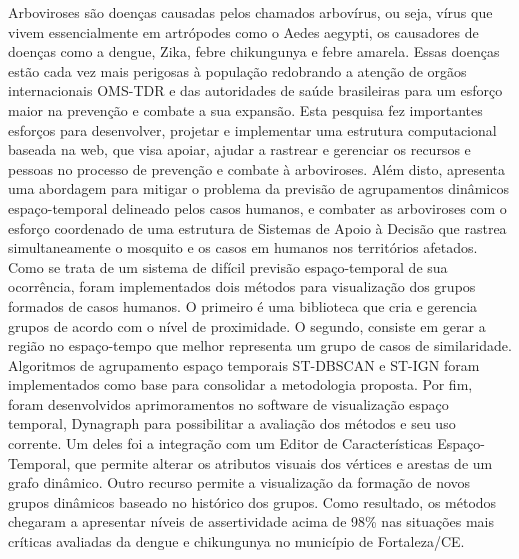 Arboviroses são doenças causadas pelos chamados arbovírus, ou seja, vírus que vivem essencialmente em artrópodes como o Aedes aegypti, os causadores de doenças como a dengue, Zika, febre chikungunya e febre amarela. Essas doenças estão cada vez mais perigosas à população redobrando a atenção de orgãos internacionais \acrshort{OMS}-\acrshort{TDR} e das autoridades de saúde brasileiras para um esforço maior na prevenção e combate a sua expansão. Esta pesquisa fez importantes esforços para desenvolver, projetar e implementar uma estrutura computacional baseada na web, que visa apoiar, ajudar a rastrear e gerenciar os recursos e pessoas no processo de prevenção e combate à arboviroses. Além disto, apresenta uma abordagem para mitigar o problema da previsão de agrupamentos dinâmicos espaço-temporal delineado pelos casos humanos, e combater as arboviroses com o esforço coordenado de uma estrutura de Sistemas de Apoio à Decisão que rastrea simultaneamente o mosquito e os casos em humanos nos territórios afetados.
Como se trata de um sistema de difícil previsão espaço-temporal de sua ocorrência, foram implementados dois métodos para visualização dos grupos formados de casos humanos.
O primeiro é uma biblioteca que cria e gerencia grupos de acordo com o nível de proximidade.
O segundo, consiste em gerar a região no espaço-tempo que melhor representa um grupo de casos de similaridade. Algoritmos de agrupamento espaço temporais ST-DBSCAN e ST-IGN foram implementados como base para consolidar a metodologia proposta.
Por fim, foram desenvolvidos  aprimoramentos no software de visualização espaço temporal, Dynagraph para possibilitar a avaliação dos métodos e seu uso corrente. Um deles foi a integração com um Editor de
Características Espaço-Temporal, que permite alterar os atributos visuais dos vértices e arestas de um
grafo dinâmico. Outro recurso permite a visualização da formação de novos grupos dinâmicos baseado no histórico dos grupos.
Como resultado, os métodos chegaram a apresentar níveis de assertividade acima de 98\% nas situações mais críticas avaliadas da dengue e chikungunya no município de Fortaleza/CE.


